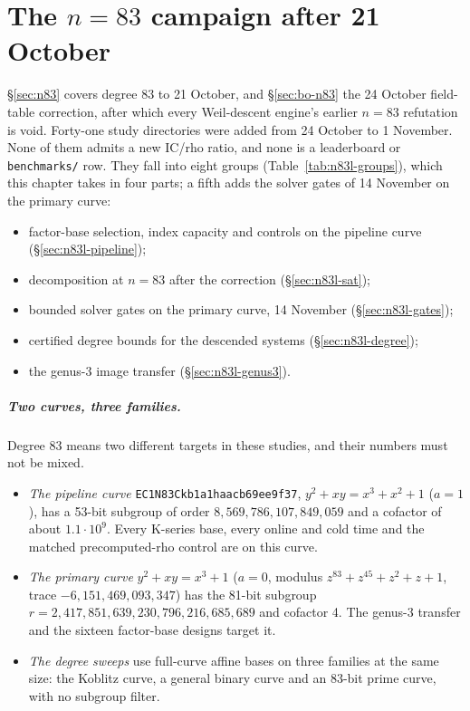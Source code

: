 \chapter{The $n=83$ campaign after 21 October}\label{ch:n83late}

\S\ref{sec:n83} covers degree 83 to 21 October, and \S\ref{sec:bo-n83} the
24 October field-table correction, after which every Weil-descent engine's earlier
$n=83$ refutation is void. Forty-one study directories were added from
24 October to 1 November. None of them admits a new IC/rho ratio, and none
is a leaderboard or \texttt{benchmarks/} row. They fall into eight groups
(Table~\ref{tab:n83l-groups}), which this chapter takes in four parts; a fifth adds the solver gates of 14
November on the primary curve:
\begin{itemize}
\item factor-base selection, index capacity and controls on the pipeline
  curve (\S\ref{sec:n83l-pipeline});
\item decomposition at $n=83$ after the correction
  (\S\ref{sec:n83l-sat});
\item bounded solver gates on the primary curve, 14 November
  (\S\ref{sec:n83l-gates});
\item certified degree bounds for the descended systems
  (\S\ref{sec:n83l-degree});
\item the genus-3 image transfer (\S\ref{sec:n83l-genus3}).
\end{itemize}

\paragraph{Two curves, three families.} Degree 83 means two different
targets in these studies, and their numbers must not be mixed.
\begin{itemize}
\item \emph{The pipeline curve} \texttt{EC1N83Ckb1a1haacb69ee9f37},
  $y^2+xy=x^3+x^2+1$ ($a=1$), has a 53-bit subgroup of order
  $8{,}569{,}786{,}107{,}849{,}059$ and a cofactor of about
  $1.1\cdot10^9$. Every K-series base, every online and cold time and the
  matched precomputed-rho control are on this curve.
\item \emph{The primary curve} $y^2+xy=x^3+1$ ($a=0$, modulus
  $z^{83}+z^{45}+z^2+z+1$, trace $-6{,}151{,}469{,}093{,}347$) has the 81-bit
  subgroup $r=2{,}417{,}851{,}639{,}230{,}796{,}216{,}685{,}689$ and cofactor
  4. The genus-3 transfer and the sixteen factor-base designs target it.
\item \emph{The degree sweeps} use full-curve affine bases on three
  families at the same size: the Koblitz curve, a general binary curve and an
  83-bit prime curve, with no subgroup filter.
\end{itemize}

